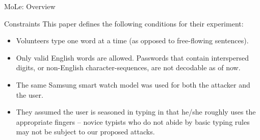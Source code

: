 \documentclass[ucs,9pt]{beamer}
\begin{document}
\begin{frame}{MoLe: Overview}
	
\end{frame}


\begin{frame}{Constraints}
	This paper defines the following conditions for their experiment:
	\begin{itemize}
		\item Volunteers type one word at a time (as opposed to free-flowing
		sentences).
		\item Only valid English words are allowed. Passwords that contain interspersed digits, or non-English character-sequences, are not decodable as of now.
		\item  The same Samsung smart watch model was used for both
		the attacker and the user.
		\item They assumed the user is seasoned in typing in that he/she roughly
		uses the appropriate fingers – novice typists who do not abide by
		basic typing rules may not be subject to our proposed attacks.
	\end{itemize}
\end{frame}
\end{document}
